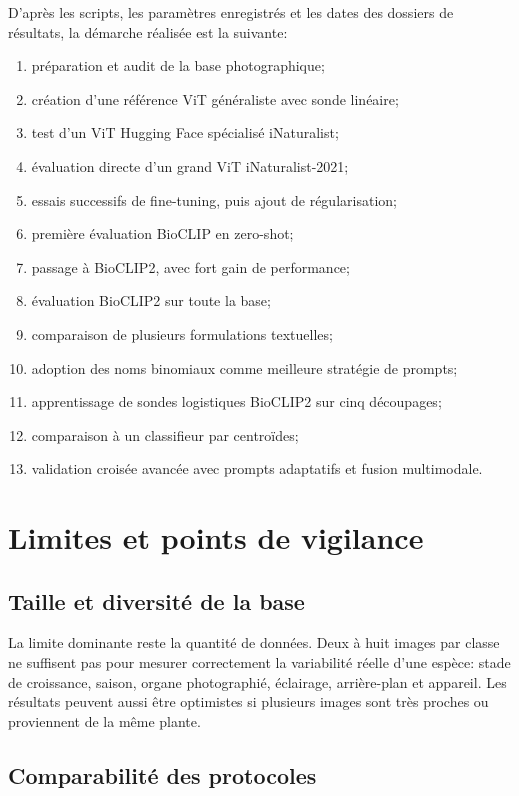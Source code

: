 \documentclass[11pt,a4paper]{report}
\begin{document}
D'après les scripts, les paramètres enregistrés et les dates des dossiers de
résultats, la démarche réalisée est la suivante:
\begin{enumerate}
  \item préparation et audit de la base photographique;
  \item création d'une référence ViT généraliste avec sonde linéaire;
  \item test d'un ViT Hugging Face spécialisé iNaturalist;
  \item évaluation directe d'un grand ViT iNaturalist-2021;
  \item essais successifs de fine-tuning, puis ajout de régularisation;
  \item première évaluation BioCLIP en zero-shot;
  \item passage à BioCLIP2, avec fort gain de performance;
  \item évaluation BioCLIP2 sur toute la base;
  \item comparaison de plusieurs formulations textuelles;
  \item adoption des noms binomiaux comme meilleure stratégie de prompts;
  \item apprentissage de sondes logistiques BioCLIP2 sur cinq découpages;
  \item comparaison à un classifieur par centroïdes;
  \item validation croisée avancée avec prompts adaptatifs et fusion multimodale.
\end{enumerate}

\chapter{Limites et points de vigilance}

\section{Taille et diversité de la base}

La limite dominante reste la quantité de données. Deux à huit images par classe
ne suffisent pas pour mesurer correctement la variabilité réelle d'une espèce:
stade de croissance, saison, organe photographié, éclairage, arrière-plan et
appareil. Les résultats peuvent aussi être optimistes si plusieurs images sont
très proches ou proviennent de la même plante.

\section{Comparabilité des protocoles}
\end{document}
